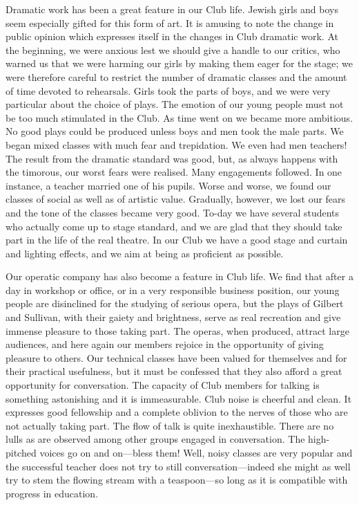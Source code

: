 Dramatic work has been a great feature in our Club
life. Jewish girls and boys seem especially gifted for
this form of art. It is amusing to note the change in
public opinion which expresses itself in the changes in
Club dramatic work. At the beginning, we were anxious
lest we should give a handle to our critics, who warned
us that we were harming our girls by making them eager
for the stage; we were therefore careful to restrict the
number of dramatic classes and the amount of time
devoted to rehearsals. Girls took the parts of boys, and
we were very particular about the choice of plays. The
emotion of our young people must not be too much
stimulated in the Club. As time went on we became more
ambitious. No good plays could be produced unless boys
and men took the male parts. We began mixed classes
with much fear and trepidation. We even had men
teachers! The result from the dramatic standard was
good, but, as always happens with the timorous, our worst
fears were realised. Many engagements followed. In
one instance, a teacher married one of his pupils. Worse
and worse, we found our classes of social as well as of
artistic value. Gradually, however, we lost our fears and
the tone of the classes became very good. To-day we
have several students who actually come up to stage
standard, and we are glad that they should take part in the
life of the real theatre. In our Club we have a good stage
and curtain and lighting effects, and we aim at being as
proficient as possible.

Our operatic company has also become a feature in
Club life. We find that after a day in workshop or office,
or in a very responsible business position, our young
people are disinclined for the studying of serious opera,
but the plays of Gilbert and Sullivan, with their gaiety
and brightness, serve as real recreation and give immense
pleasure to those taking part. The operas, when produced,
attract large audiences, and here again our members
rejoice in the opportunity of giving pleasure to others.
Our technical classes have been valued for themselves
and for their practical usefulness, but it must be confessed
that they also afford a great opportunity for conversation.
The capacity of Club members for talking is something
astonishing and it is immeasurable. Club noise is
cheerful and clean. It expresses good fellowship and a
complete oblivion to the nerves of those who are not actually
taking part. The flow of talk is quite inexhaustible. There
are no lulls as are observed among other groups engaged
in conversation. The high-pitched voices go on and
on—bless them! Well, noisy classes are very popular and
the successful teacher does not try to still conversation—indeed
she might as well try to stem the flowing stream
with a teaspoon—so long as it is compatible with progress
in education.

